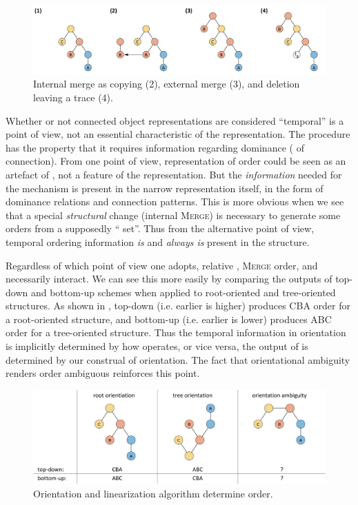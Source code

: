   
\begin{figure}
\includegraphics[width=\textwidth]{figures/Tilsen-img43.png}
\caption{Internal merge as copying (2), external merge (3), and deletion leaving a trace (4).}
\label{fig:3:15}
\end{figure}
 

  Whether or not connected object representations are considered “temporal” is a point of view, not an essential characteristic of the representation. The  procedure has the property that it requires information regarding dominance ( of connection). From one point of view, representation of order could be seen as an artefact of , not a feature of the  representation. But the \textit{information} needed for the  mechanism is present in the narrow representation itself, in the form of dominance relations and connection patterns. This is more obvious when we see that a special \textit{structural} change (internal \textsc{Merge}) is necessary to generate some orders from a supposedly “ set”. Thus from the alternative point of view, temporal ordering information \textit{is} and \textit{always is} present in the structure. 

  Regardless of which point of view one adopts, relative , \textsc{Merge} order, and  necessarily interact. We can see this more easily by comparing the outputs of top-down and bottom-up  schemes when applied to root-oriented and tree-oriented structures. As shown in {}, top-down  (i.e. earlier is higher) produces CBA order for a root-oriented structure, and bottom-up  (i.e. earlier is lower) produces ABC order for a tree-oriented structure. Thus the temporal information in orientation is implicitly determined by how  operates, or vice versa, the output of  is determined by our construal of orientation. The fact that orientational ambiguity renders order ambiguous reinforces this point.

  
\begin{figure}
\includegraphics[width=\textwidth]{figures/Tilsen-img44.png}
\caption{Orientation and linearization algorithm determine order.}
\label{fig:3:16}
\end{figure}
 

